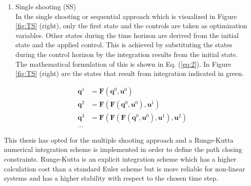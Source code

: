 \begin{enumerate}
%	
	\item Single shooting (SS)\\  
	In the single shooting or sequential approach which is visualized in Figure \ref{fig:TS} (right), only the first state and the controls are taken as optimization variables. Other states during the time horizon are derived from the initial state and the applied control. This is achieved by substituting the states during the control horizon by the integration results from the initial state. The mathematical formulation of this is shown in Eq. (\ref{eq:2}). In Figure \ref{fig:TS} (right) are the states that result from integration indicated in green. \cite{Gillis2019}
	
	\begin{equation}\label{eq:2}
	\begin{aligned}
	\bm{q}^1 &= \bm{F}(\bm{q}^0, \bm{u}^0)\\
	\bm{q}^2 &= \bm{F}(\bm{F}(\bm{q}^0, \bm{u}^0), \bm{u}^1)\\
	\bm{q}^3 &= \bm{F}(\bm{F}(\bm{F}(\bm{q}^0, \bm{u}^0), \bm{u}^1), \bm{u}^2)\\
	...
	\end{aligned}
	\end{equation}
\end{enumerate}

This thesis has opted for the multiple shooting approach and a Runge-Kutta numerical integration scheme is implemented in order to define the path closing constraints. Runge-Kutta is an explicit integration scheme which has a higher calculation cost than a standard Euler scheme but is more reliable for non-linear systems and has a higher stability with respect to the chosen time step. \cite{Mercy2018}

